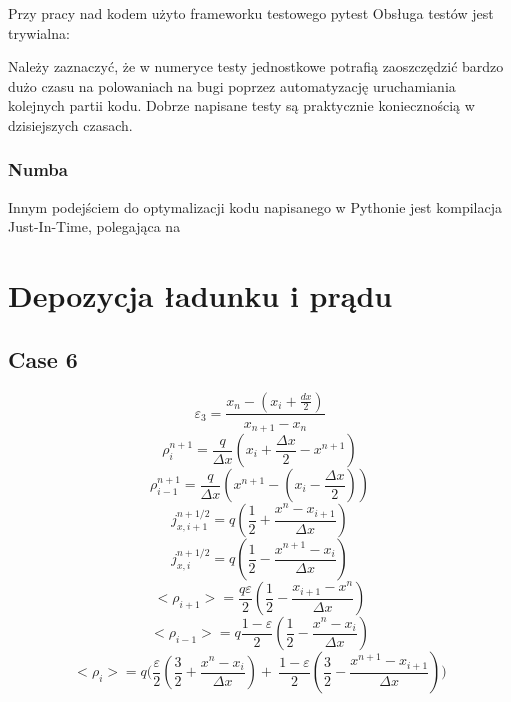 Przy pracy nad kodem użyto frameworku testowego pytest %
Obsługa testów jest trywialna:

Należy zaznaczyć, że w numeryce testy jednostkowe potrafią zaoszczędzić bardzo dużo czasu na polowaniach na bugi
poprzez automatyzację uruchamiania kolejnych partii kodu. Dobrze napisane testy są praktycznie koniecznością w dzisiejszych
czasach. %

\subsubsection{Numba}

Innym podejściem do optymalizacji kodu napisanego w Pythonie jest kompilacja Just-In-Time, polegająca na %

\section{Depozycja ładunku i prądu}

\subsection{Case 6}
\begin{equation}
    \varepsilon_3 = \frac{x_n - (x_i + \frac{dx}{2})}{x_{n+1} - x_n}
\end{equation}
\begin{equation}
    \rho_i^{n+1} = \frac{q}{\Delta x} (x_i + \frac{\Delta x}{2} - x^{n+1})
\end{equation}
\begin{equation}
    \rho_{i-1}^{n+1} = \frac{q}{\Delta x} (x^{n+1} - (x_i - \frac{\Delta x}{2}))
\end{equation}
\begin{equation}
    j_{x,i+1}^{n+1/2} = q (\frac{1}{2} + \frac{x^n - x_{i+1}}{\Delta x})
\end{equation}
\begin{equation}
    j_{x,i}^{n+1/2} = q (\frac{1}{2} - \frac{x^{n+1} - x_i}{\Delta x})
\end{equation}
\begin{equation}
    <\rho_{i+1}> = \frac{q \varepsilon}{2} (\frac{1}{2} - \frac{x_{i+1} - x^n}{\Delta x})
\end{equation}
\begin{equation}
    <\rho_{i-1}> = q \frac{1- \varepsilon}{2} (\frac{1}{2} - \frac{x^n - x_i}{\Delta x})
\end{equation}
\begin{equation}
    <\rho_{i}> = q \Bigg(\frac{\varepsilon}{2} (\frac{3}{2} + \frac{x^n-x_i}{\Delta x}) +\
    \frac{1-\varepsilon}{2} (\frac{3}{2} - \frac{x^{n+1} - x_{i+1}}{\Delta x})\Bigg)
\end{equation}
